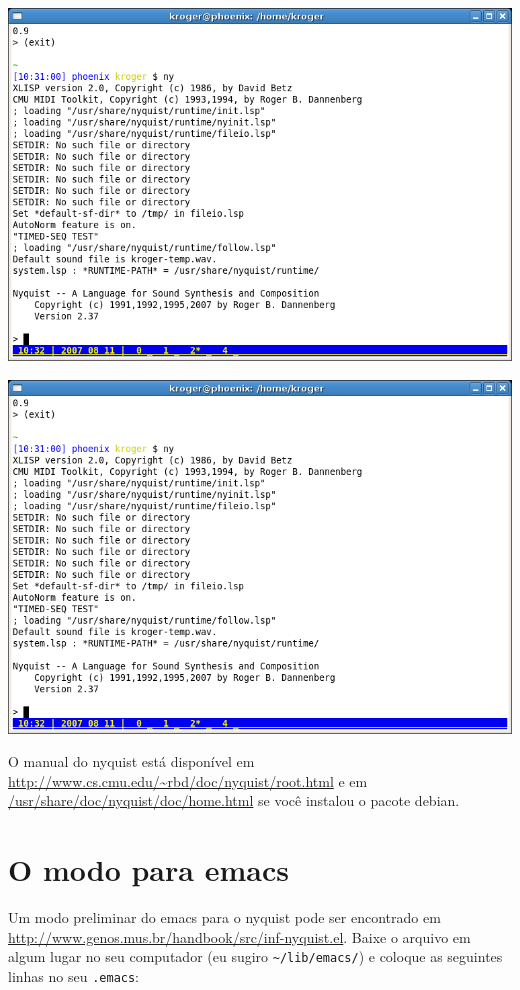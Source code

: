 \documentclass[12pt,brazil]{book}
\begin{document}
\begin{htmlonly}
  \includegraphics{ny1}
\end{htmlonly}

\begin{latexonly}
  \includegraphics[scale=.5]{ny1}
\end{latexonly}

O manual do nyquist está disponível em
\url{http://www.cs.cmu.edu/~rbd/doc/nyquist/root.html} e em
\url{/usr/share/doc/nyquist/doc/home.html} se você instalou o pacote
debian.

\section{O modo para emacs}
\label{sec:o-modo-para-2}

Um modo preliminar do emacs para o nyquist pode ser encontrado em
\url{http://www.genos.mus.br/handbook/src/inf-nyquist.el}. Baixe o arquivo em
algum lugar no seu computador (eu sugiro \verb|~/lib/emacs/|) e
coloque as seguintes linhas no seu \texttt{.emacs}:
\end{document}
